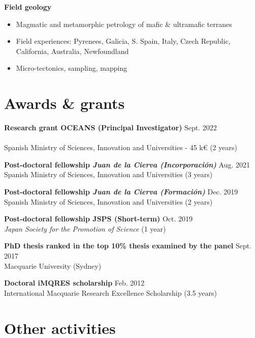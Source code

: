 \documentclass[a4paper,11pt]{article}
\begin{document}
    \textbf{Field geology}
    \begin{itemize}[itemsep=0pt,parsep=2pt]
        \item Magmatic and metamorphic petrology of mafic \& ultramafic terranes
        \item Field experiences: Pyrenees, Galicia, S. Spain, Italy, Czech Republic, California, Australia, Newfoundland
        \item Micro-tectonics, sampling, mapping
    \end{itemize}

\section{Awards \& grants}

    \textbf{Research grant OCEANS (Principal Investigator)}
    \hfill {Sept. 2022}\\
    \\
    Spanish Ministry of Sciences, Innovation and Universities - 45 k€ (2 years)
    
    \textbf{Post-doctoral fellowship \textit{Juan de la Cierva (Incorporación)}}
    \hfill {Aug. 2021}\\
    Spanish Ministry of Sciences, Innovation and Universities (3 years)
    
    \textbf{Post-doctoral fellowship \textit{Juan de la Cierva (Formación)}}
    \hfill {Dec. 2019}\\
    Spanish Ministry of Sciences, Innovation and Universities (2 years)
    
    \textbf{Post-doctoral fellowship JSPS (Short-term)}
    \hfill {Oct. 2019}\\
    \textit{Japan Society for the Promotion of Science} (1 year)
    
    \textbf{PhD thesis ranked in the top 10\% thesis examined by the panel}
    \hfill {Sept. 2017}\\
    Macquarie University (Sydney)
    
    \textbf{Doctoral iMQRES scholarship}
    \hfill {Feb. 2012}\\
    International Macquarie Research Excellence Scholarship (3.5 years)

\section{Other activities}
\end{document}
